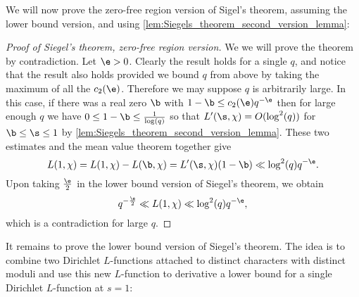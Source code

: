       We will now prove the zero-free region version of Sigel's theorem, assuming the lower bound version, and using \cref{lem:Siegels_theorem_second_version_lemma}:

      \begin{proof}[Proof of Siegel's theorem, zero-free region version]
        We we will prove the theorem by contradiction. Let $\e > 0$. Clearly the result holds for a single $q$, and notice that the result also holds provided we bound $q$ from above by taking the maximum of all the $c_{2}(\e)$. Therefore we may suppose $q$ is arbitrarily large. In this case, if there was a real zero $\b$ with $1-\b \le c_{2}(\e)q^{-\e}$ then for large enough $q$ we have $0 \le 1-\b \le \frac{1}{\log(q)}$ so that $L'(\s,\chi) = O(\log^{2}(q))$ for $\b \le \s \le 1$ by \cref{lem:Siegels_theorem_second_version_lemma}. These two estimates and the mean value theorem together give
        \[
          L(1,\chi) = L(1,\chi)-L(\b,\chi) = L'(\s,\chi)(1-\b) \ll \log^{2}(q)q^{-\e}.
        \]
        Upon taking $\frac{\e}{2}$ in the lower bound version of Siegel's theorem, we obtain
        \[
          q^{-\frac{\e}{2}} \ll L(1,\chi) \ll \log^{2}(q)q^{-\e},
        \]
        which is a contradiction for large $q$.
      \end{proof}

      It remains to prove the lower bound version of Siegel's theorem. The idea is to combine two Dirichlet $L$-functions attached to distinct characters with distinct moduli and use this new $L$-function to derivative a lower bound for a single Dirichlet $L$-function at $s = 1$:

